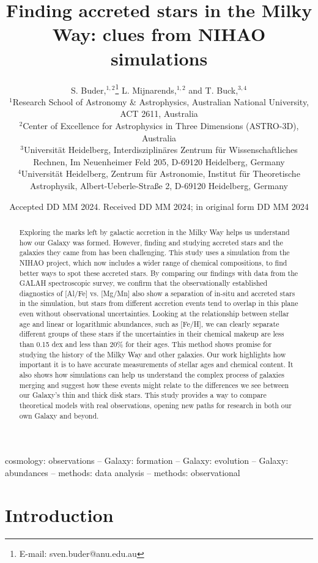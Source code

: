 \documentclass[fleqn,usenatbib]{mnras}
\title[Accreted stars in NIHAO and GALAH]{Finding accreted stars in the Milky Way: clues from NIHAO simulations}
\author[Buder, Mijnarends, and Buck]{
S. Buder,$^{1,2}$\thanks{E-mail: sven.buder@anu.edu.au}
L. Mijnarends,$^{1,2}$ and
T. Buck,$^{3,4}$
\\
$^{1}$Research School of Astronomy \& Astrophysics, Australian National University, ACT 2611, Australia\\
$^{2}$Center of Excellence for Astrophysics in Three Dimensions (ASTRO-3D), Australia\\
$^{3}$Universit{\"a}t Heidelberg, Interdisziplin{\"a}res Zentrum f{\"u}r Wissenschaftliches Rechnen, Im Neuenheimer Feld 205, D-69120 Heidelberg, Germany\\
$^{4}$Universit{\"a}t Heidelberg, Zentrum f{\"u}r Astronomie, Institut f{\"u}r Theoretische Astrophysik, Albert-Ueberle-Straße 2, D-69120 Heidelberg, Germany
}
\date{Accepted DD MM 2024. Received DD MM 2024; in original form DD MM 2024}
\begin{document}
\label{firstpage}
\pagerange{\pageref{firstpage}--\pageref{lastpage}}
\maketitle

\begin{abstract} %
Exploring the marks left by galactic accretion in the Milky Way helps us understand how our Galaxy was formed. However, finding and studying accreted stars and the galaxies they came from has been challenging. This study uses a simulation from the NIHAO project, which now includes a wider range of chemical compositions, to find better ways to spot these accreted stars. By comparing our findings with data from the GALAH spectroscopic survey, we confirm that the observationally established diagnostics of [Al/Fe] vs. [Mg/Mn] also show a separation of in-situ and accreted stars in the simulation, but stars from different accretion events tend to overlap in this plane even without observational uncertainties. Looking at the relationship between stellar age and linear or logarithmic abundances, such as [Fe/H], we can clearly separate different groups of these stars if the uncertainties in their chemical makeup are less than 0.15 dex and less than 20\% for their ages. This method shows promise for studying the history of the Milky Way and other galaxies. Our work highlights how important it is to have accurate measurements of stellar ages and chemical content. It also shows how simulations can help us understand the complex process of galaxies merging and suggest how these events might relate to the differences we see between our Galaxy's thin and thick disk stars. This study provides a way to compare theoretical models with real observations, opening new paths for research in both our own Galaxy and beyond.
\end{abstract}
\begin{keywords}
cosmology: observations -- Galaxy: formation -- Galaxy: evolution -- Galaxy: abundances -- methods: data analysis -- methods: observational
\end{keywords}



\section{Introduction}
\label{sec:intro}
\end{document}
